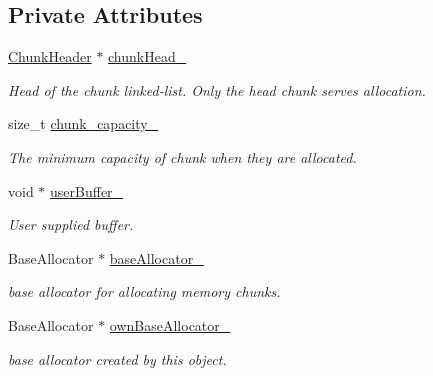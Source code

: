\subsection*{Private Attributes}
\begin{DoxyCompactItemize}
\item 
\hyperlink{struct_memory_pool_allocator_1_1_chunk_header}{Chunk\+Header} $\ast$ \hyperlink{class_memory_pool_allocator_a576a6419b3153d1649b36b3f0c74d8b0}{chunk\+Head\+\_\+}\hypertarget{class_memory_pool_allocator_a576a6419b3153d1649b36b3f0c74d8b0}{}\label{class_memory_pool_allocator_a576a6419b3153d1649b36b3f0c74d8b0}

\begin{DoxyCompactList}\small\item\em Head of the chunk linked-\/list. Only the head chunk serves allocation. \end{DoxyCompactList}\item 
size\+\_\+t \hyperlink{class_memory_pool_allocator_a67909468c193d429a227a74d35c4d8cb}{chunk\+\_\+capacity\+\_\+}\hypertarget{class_memory_pool_allocator_a67909468c193d429a227a74d35c4d8cb}{}\label{class_memory_pool_allocator_a67909468c193d429a227a74d35c4d8cb}

\begin{DoxyCompactList}\small\item\em The minimum capacity of chunk when they are allocated. \end{DoxyCompactList}\item 
void $\ast$ \hyperlink{class_memory_pool_allocator_aa3c4d2503b12acc7d14e4a5da67ac46e}{user\+Buffer\+\_\+}\hypertarget{class_memory_pool_allocator_aa3c4d2503b12acc7d14e4a5da67ac46e}{}\label{class_memory_pool_allocator_aa3c4d2503b12acc7d14e4a5da67ac46e}

\begin{DoxyCompactList}\small\item\em User supplied buffer. \end{DoxyCompactList}\item 
Base\+Allocator $\ast$ \hyperlink{class_memory_pool_allocator_a628cd7f46e838fb37ceccf65dd17bce6}{base\+Allocator\+\_\+}\hypertarget{class_memory_pool_allocator_a628cd7f46e838fb37ceccf65dd17bce6}{}\label{class_memory_pool_allocator_a628cd7f46e838fb37ceccf65dd17bce6}

\begin{DoxyCompactList}\small\item\em base allocator for allocating memory chunks. \end{DoxyCompactList}\item 
Base\+Allocator $\ast$ \hyperlink{class_memory_pool_allocator_a3e1e1bf108de2e6985c6d38964f8e3b9}{own\+Base\+Allocator\+\_\+}\hypertarget{class_memory_pool_allocator_a3e1e1bf108de2e6985c6d38964f8e3b9}{}\label{class_memory_pool_allocator_a3e1e1bf108de2e6985c6d38964f8e3b9}

\begin{DoxyCompactList}\small\item\em base allocator created by this object. \end{DoxyCompactList}\end{DoxyCompactItemize}
